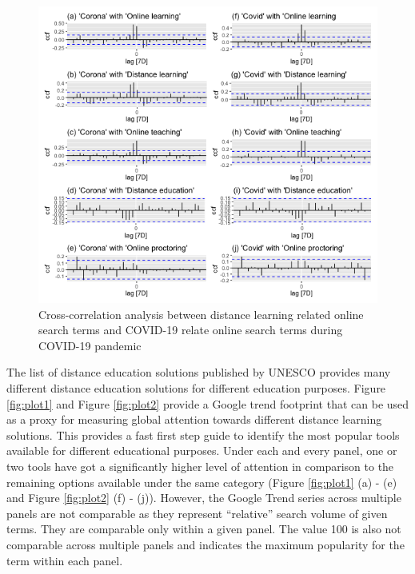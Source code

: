 \documentclass[11pt,a4paper,]{article}
\begin{document}
\begin{figure}[h]

{\centering \includegraphics[width=1\textwidth]{figure/ccfAnalysis-1} 

}

\caption{Cross-correlation analysis between distance learning related online search terms and COVID-19 relate online search terms during COVID-19 pandemic}\label{fig:ccfAnalysis}
\end{figure}

The list of distance education solutions published by UNESCO provides many different distance education solutions for different education purposes. Figure \ref{fig:plot1} and Figure \ref{fig:plot2} provide a Google trend footprint that can be used as a proxy for measuring global attention towards different distance learning solutions. This provides a fast first step guide to identify the most popular tools available for different educational purposes. Under each and every panel, one or two tools have got a significantly higher level of attention in comparison to the remaining options available under the same category (Figure \ref{fig:plot1} (a) - (e) and Figure \ref{fig:plot2} (f) - (j)). However, the Google Trend series across multiple panels are not comparable as they represent ``relative'' search volume of given terms. They are comparable only within a given panel. The value 100 is also not comparable across multiple panels and indicates the maximum popularity for the term within each panel.
\end{document}
